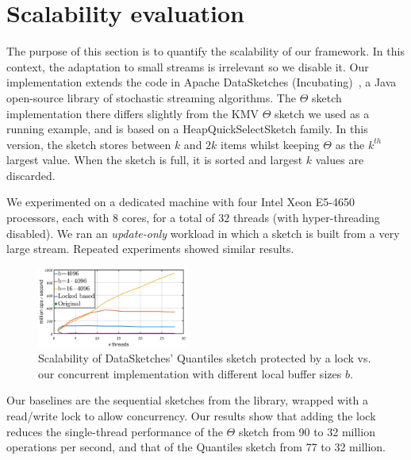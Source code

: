 \section{Scalability evaluation}
\label{sec:evaluation}


The purpose of this section is to quantify the scalability of
our  framework. In this context, the adaptation to small streams is irrelevant so we disable it.
%
Our implementation extends the code in Apache DataSketches (Incubating)~\cite{DataSketches}, a Java
open-source library of stochastic streaming algorithms. The $\Theta$ sketch implementation there
differs slightly from the KMV $\Theta$ sketch we  used as a running example, and is
based on a HeapQuickSelectSketch family. In this version, the sketch stores between $k$ and $2k$ items
whilst keeping $\Theta$ as the $k^{th}$ largest value. When the sketch is full,
it is sorted and largest $k$ values are discarded. 

We experimented on a dedicated machine with four Intel
Xeon E5-4650 processors, each with $8$ cores, for a total of
$32$ threads (with hyper-threading disabled).
We ran an \emph{update-only} workload in
which a sketch is built from a very large stream. Repeated experiments showed similar results. 


\begin{figure}[tb]
\setlength{\abovecaptionskip}{0pt}
\setlength{\belowcaptionskip}{0pt}
\setlength\textfloatsep{0pt}
  \begin{center}
    \includegraphics[width=0.44\textwidth]{images/QuantilesUpdate.png}
  \end{center}
  \caption{Scalability of DataSketches' Quantiles sketch 
  protected by a lock vs. our concurrent implementation with different local
  buffer sizes $b$.}
      \label{fig:ConccurentQuantilesUpdate}
\end{figure}





Our baselines are the sequential sketches
from the library, wrapped with a read/write lock
to allow concurrency. Our results show that adding the lock reduces
the single-thread performance of the $\Theta$ sketch
from 90 to 32 million operations per second, and that of the Quantiles
sketch from 77 to 32 million.

